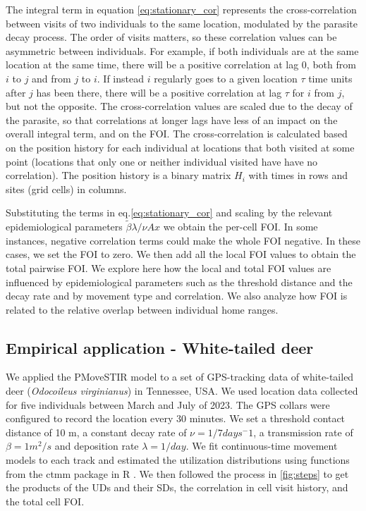 \documentclass[letterpaper]{article}
\begin{document}
The integral term in equation \ref{eq:stationary_cor} represents the cross-correlation between visits of two individuals to the same location, modulated by the parasite decay process. The order of visits matters, so these correlation values can be asymmetric between individuals. 
For example, if both individuals are at the same location at the same time, there will be a positive correlation at lag 0, both from $i$ to $j$ and from $j$ to $i$. If instead $i$ regularly goes to a given location $\tau$ time units after $j$ has been there, there will be a positive correlation at lag $\tau$ for $i$ from $j$, but not the opposite. The cross-correlation values are scaled due to the decay of the parasite, so that correlations at longer lags have less of an impact on the overall integral term, and on the FOI.
The cross-correlation is calculated based on the position history for each individual at locations that both visited at some point (locations that only one or neither individual visited have have no correlation). The position history is a binary matrix $H_i$ with times in rows and sites (grid cells) in columns. 

Substituting the terms in eq.\ref{eq:stationary_cor} and scaling by the relevant epidemiological parameters $\tilde\beta\lambda/\nu Ax$ we obtain the per-cell FOI. In some instances, negative correlation terms could make the whole FOI negative. In these cases, we set the FOI to zero. We then add all the local FOI values to obtain the total pairwise FOI.
We explore here how the local and total FOI values are influenced by epidemiological parameters such as the threshold distance and the decay rate and by movement type and correlation. We also analyze how FOI is related to the relative overlap between individual home ranges.

\subsection*{Empirical application - White-tailed deer}
We applied the PMoveSTIR model to a set of GPS-tracking data of white-tailed deer (\emph{Odocoileus virginianus}) in Tennessee, USA.
We used location data collected for five individuals between March and July of 2023. The GPS collars were configured to record the location every 30 minutes.
We set a threshold contact distance of 10 m, a constant decay rate of $\nu=1/7 days^-1$, a transmission rate of $\beta=1 m^2/s$ and deposition rate $\lambda=1/day$.
We fit continuous-time movement models to each track and estimated the utilization distributions using functions from the ctmm package in R \citep{Calabrese2016}. 
We then followed the process in \ref{fig:steps} to get the products of the UDs and their SDs, the correlation in cell visit history, and the total cell FOI.
\end{document}
